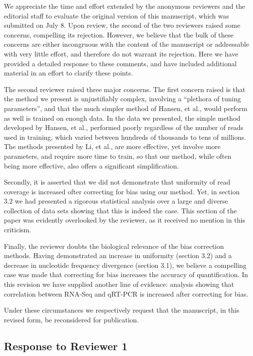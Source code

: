 \documentclass{article}
\begin{document}
We appreciate the time and effort extended by the anonymous reviewers and the
editorial staff to evaluate the original version of this manuscript, which was
submitted on July 8. Upon review, the second of the two reviewers raised some
concerns, compelling its rejection. However, we believe that the bulk of these
concerns are either incongruous with the content of the manuscript or
addressable with very little effort, and therefore do not warrant its rejection.
Here we have provided a detailed response to these comments, and have included
additional material in an effort to clarify these points.

The second reviewer raised three major concerns. The first concern raised is
that the method we present is unjustifiably complex, involving a ``plethora of
tuning parameters'', and that the much simpler method of Hansen, et al., would
perform as well is trained on enough data.  In the data we presented, the simple
method developed by Hansen, et al., performed poorly regardless of the number of
reads used in training, which varied between hundreds of thousands to tens of
millions.  The methods presented by Li, et al., are more effective, yet involve
more parameters, and require more time to train, so that our method, while often
being more effective, also offers a significant simplification.

Secondly, it is asserted that we did not demonstrate that uniformity of read
coverage is increased ofter correcting for bias using our method.  Yet, in
section 3.2 we had presented a rigorous statistical analysis over a large and
diverse collection of data sets showing that this is indeed the case. This
section of the paper was evidently overlooked by the reviewer, as it received
no mention in this criticism.

Finally, the reviewer doubts the biological relevance of the bias correction
methods. Having demonstrated an increase in uniformity (section 3.2) and a
decrease in nucleotide frequency divergence (section 3.1), we believe a
compelling case was made that correcting for bias increases the accuracy of
quantification. In this revision we have supplied another line of evidence:
analysis showing that correlation between RNA-Seq and qRT-PCR is increased after
correcting for bias.

Under these circumstances we respectively request that the manuscript, in this
revised form, be reconsidered for publication.


\subsection*{Response to Reviewer 1}
\end{document}
